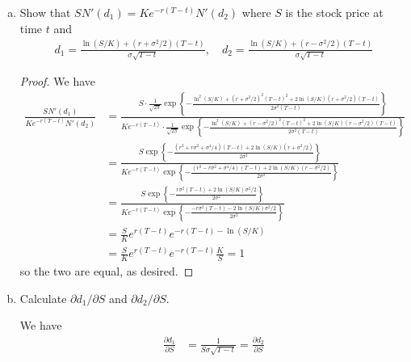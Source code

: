 \documentclass{article}
\begin{document}
\begin{itemize}
\begin{enumerate}[(a)]
			\item Show that $SN'(d_1)=Ke^{-r(T-t)}N'(d_2)$ where $S$ is the stock price at time $t$ and
				\begin{align*}
					d_1=\frac{\ln(S/K)+(r+\sigma^2/2)(T-t)}{\sigma\sqrt{T-t}}, \quad d_2 = \frac{\ln(S/K)+(r-\sigma^2/2)(T-t)}{\sigma\sqrt{T-t}}
				\end{align*}
				\begin{proof}
					We have
					\begin{align*}
						\frac{SN'(d_1)}{Ke^{-r(T-t)}N'(d_2)} &= \frac{S\cdot \frac{1}{\sqrt{2\pi}}\exp\left\{ -\frac{\ln^2(S/K) + (r+\sigma^2/2)^2(T-t)^2 + 2\ln(S/K)(r+\sigma^2/2)(T-t)}{2\sigma^2(T-t)} \right\}}{Ke^{-r(T-t)}\cdot \frac{1}{\sqrt{2\pi}}\exp\left\{ -\frac{\ln^2(S/K) + (r-\sigma^2/2)^2(T-t)^2 + 2\ln(S/K)(r-\sigma^2/2)(T-t)}{2\sigma^2(T-t)} \right\}} \\
						&= \frac{S\exp\left\{ -\frac{(r^2+r\sigma^2+\sigma^4/4)(T-t) + 2\ln(S/K)(r+\sigma^2/2)}{2\sigma^2} \right\}}{Ke^{-r(T-t)}\exp\left\{ -\frac{(r^2-r\sigma^2+\sigma^4/4)(T-t) + 2\ln(S/K)(r-\sigma^2/2)}{2\sigma^2} \right\}} \\
						&= \frac{S\exp\left\{ -\frac{r\sigma^2(T-t) + 2\ln(S/K)\sigma^2/2}{2\sigma^2} \right\}}{Ke^{-r(T-t)}\exp\left\{ -\frac{-r\sigma^2(T-t)-2\ln(S/K)\sigma^2/2}{2\sigma^2} \right\}} \\
						&= \frac{S}{K}e^{r(T-t)}e^{-r(T-t)-\ln(S/K)} \\
						&= \frac{S}{K}e^{r(T-t)}e^{-r(T-t)}\frac{K}{S} = 1
					\end{align*}
					so the two are equal, as desired.
				\end{proof}

			\item Calculate $\partial d_1/\partial S$ and $\partial d_2/\partial S.$
				\begin{soln}
					We have
					\begin{align*}
						\frac{\partial d_1}{\partial S} &= \frac{1}{S\sigma\sqrt{T-t}} = \frac{\partial d_2}{\partial S}
					\end{align*}
				\end{soln}


\end{enumerate}
\end{itemize}
\end{document}
